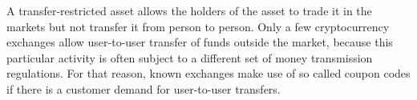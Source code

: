A transfer-restricted asset allows the holders of the asset to trade it in the
markets but not transfer it from person to person. Only a few cryptocurrency
exchanges allow user-to-user transfer of funds outside the market, because this
particular activity is often subject to a different set of money transmission
regulations. For that reason, known exchanges make use of so called coupon
codes if there is a customer demand for user-to-user transfers.
